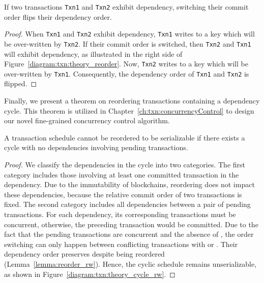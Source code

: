 \begin{lemma} 
  \label{lemma:reorder_ww}
  If two transactions \texttt{Txn1} and \texttt{Txn2} exhibit 
  dependency, switching their commit order flips their dependency order.
\end{lemma}

\begin{proof}
  When \texttt{Txn1} and \texttt{Txn2} exhibit  dependency,
  \texttt{Txn1} writes to a key which will be over-written by \texttt{Txn2}.
  If their commit order is switched, then \texttt{Txn2} and \texttt{Txn1} will
  exhibit  dependency, as illustrated in the right side of
  Figure~\ref{diagram:txn:theory_reorder}.
  Now, \texttt{Txn2} writes to a key which will be over-written by \texttt{Txn1}.
  Consequently, the dependency order of \texttt{Txn1} and \texttt{Txn2} is flipped.
\end{proof}

Finally, we present a theorem on reordering transactions containing a dependency
cycle. This theorem is utilized in Chapter~\ref{ch:txn:concurrencyControl} to
design our novel fine-grained concurrency control algorithm.

\begin{theorem}
  \label{theory:unreorderable}
  A transaction schedule cannot be reordered to be
  serializable if there exists a cycle with no  dependencies involving pending transactions.
\end{theorem}

\begin{proof}
  We classify the dependencies in the cycle into two categories. 
  The first category includes those involving at least one committed transaction in the dependency. 
  Due to the immutability of blockchains, reordering does not impact these dependencies, because the relative commit order of two transactions is fixed.
  The second category includes all dependencies between a pair of pending transactions. 
  For each dependency, its corresponding transactions must be concurrent, otherwise, the preceding transaction would be committed. 
  Due to the fact that the pending transactions are concurrent and the absence of , the order switching can only happen between conflicting transactions with  or .
  Their dependency order preserves despite being reordered (Lemma~\ref{lemma:reorder_rw}).
  Hence, the cyclic schedule remains unserializable, as shown in
  Figure~\ref{diagram:txn:theory_cycle_rw}.
\end{proof}

